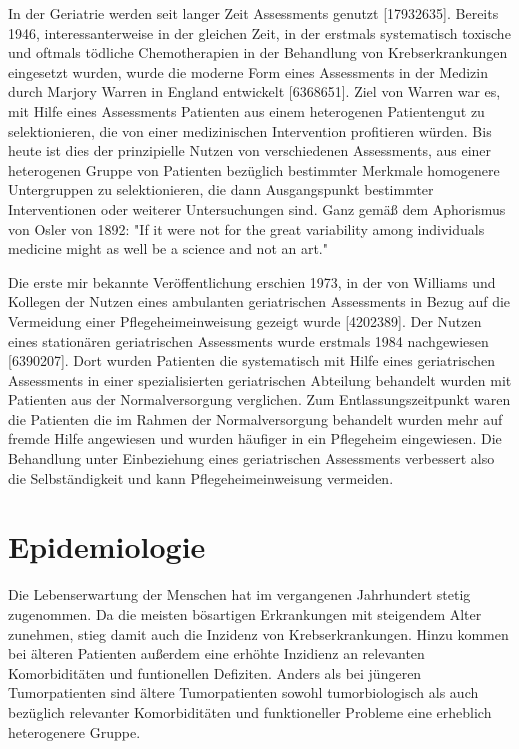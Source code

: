 In der Geriatrie werden seit langer Zeit Assessments genutzt [17932635].
Bereits 1946, interessanterweise in der gleichen Zeit, in der erstmals
systematisch toxische und oftmals tödliche Chemotherapien in der
Behandlung von Krebserkrankungen eingesetzt wurden, wurde die moderne
Form eines Assessments in der Medizin durch Marjory Warren in England
entwickelt [6368651]. Ziel von Warren war es, mit Hilfe eines
Assessments Patienten aus einem heterogenen Patientengut zu
selektionieren, die von einer medizinischen Intervention profitieren
würden. Bis heute ist dies der prinzipielle Nutzen von verschiedenen
Assessments, aus einer heterogenen Gruppe von Patienten bezüglich
bestimmter Merkmale homogenere Untergruppen zu selektionieren, die
dann Ausgangspunkt bestimmter Interventionen oder weiterer
Untersuchungen sind. Ganz gemäß dem Aphorismus von Osler von 1892: "If
it were not for the great variability among individuals medicine might
as well be a science and not an art."

Die erste mir bekannte Veröffentlichung erschien 1973, in der von
Williams und Kollegen der Nutzen eines ambulanten geriatrischen
Assessments in Bezug auf die Vermeidung einer Pflegeheimeinweisung
gezeigt wurde [4202389]. Der Nutzen eines stationären geriatrischen
Assessments wurde erstmals 1984 nachgewiesen [6390207]. Dort wurden
Patienten die systematisch mit Hilfe eines geriatrischen Assessments
in einer spezialisierten geriatrischen Abteilung behandelt wurden mit
Patienten aus der Normalversorgung verglichen. Zum
Entlassungszeitpunkt waren die Patienten die im Rahmen der
Normalversorgung behandelt wurden mehr auf fremde Hilfe angewiesen und
wurden häufiger in ein Pflegeheim eingewiesen. Die Behandlung unter
Einbeziehung eines geriatrischen Assessments verbessert also die
Selbständigkeit und kann Pflegeheimeinweisung vermeiden.

\section{Epidemiologie}

Die Lebenserwartung der Menschen hat im vergangenen Jahrhundert stetig
zugenommen. Da die meisten bösartigen Erkrankungen mit steigendem
Alter zunehmen, stieg damit auch die Inzidenz von
Krebserkrankungen. Hinzu kommen bei älteren Patienten außerdem eine
erhöhte Inzidienz an relevanten Komorbiditäten und funtionellen
Defiziten. Anders als bei jüngeren Tumorpatienten sind ältere
Tumorpatienten sowohl tumorbiologisch als auch bezüglich relevanter
Komorbiditäten und funktioneller Probleme eine erheblich heterogenere
Gruppe.

